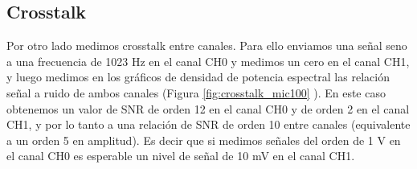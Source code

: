 \documentclass[a4paper, 11pt]{article}
\begin{document}
%
%


\subsection*{Crosstalk}
Por otro lado medimos crosstalk entre canales. Para ello enviamos una señal seno a una frecuencia de 1023 Hz en el canal CH0 y medimos un cero en el canal CH1, y luego medimos en los gráficos de densidad de potencia espectral las relación señal a ruido de ambos canales (Figura \ref{fig:crosstalk_mic100} ). En este caso obtenemos un valor de SNR de orden 12 en el canal CH0 y de orden 2 en el canal CH1,  y por lo tanto a una relación de SNR de orden 10 entre canales (equivalente a un orden 5 en amplitud).  Es decir que si medimos señales del orden de 1 V en el canal CH0 es esperable un nivel de señal de 10 mV en el canal CH1.
\end{document}
